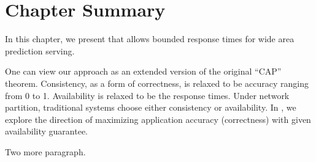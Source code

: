 \section{Chapter Summary}
\label{sec:chap-summary}

In this chapter, we present \sysname{} that allows bounded response times for
wide area prediction serving.

One can view our approach as an extended version of the original ``CAP''
theorem. Consistency, as a form of correctness, is relaxed to be accuracy
ranging from 0 to 1. Availability is relaxed to be the response times. Under
network partition, traditional systems choose either consistency or
availability. In \sysname{}, we explore the direction of maximizing application
accuracy (correctness) with given availability guarantee.

Two more paragraph.

